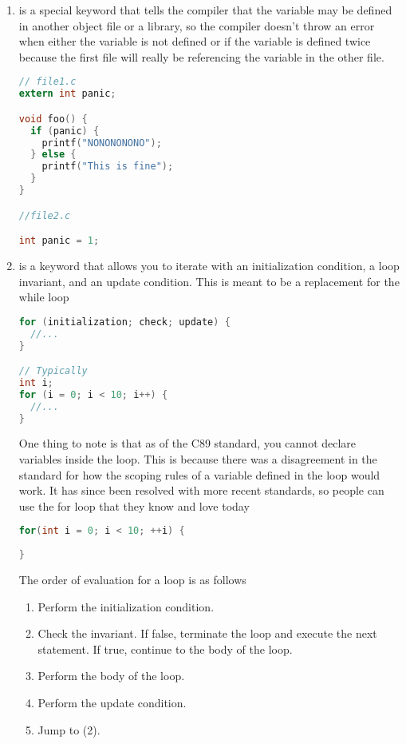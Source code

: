 \begin{enumerate}
\begin{lstlisting}[language=C]
void process_day(enum day foo) {
  switch(foo) {
    case monday:
      printf("Go home!\n"); break;
    // ...
  }
}
\end{lstlisting}

	\item {} is a special keyword that tells the compiler that the variable may be defined in another object file or a library, so the compiler doesn't throw an error when either the variable is not defined or if the variable is defined twice because the first file will really be referencing the variable in the other file.

	      \begin{lstlisting}[language=C]
// file1.c
extern int panic;

void foo() {
  if (panic) {
    printf("NONONONONO");
  } else {
    printf("This is fine");
  }
}

//file2.c

int panic = 1;
\end{lstlisting}

	\item {} is a keyword that allows you to iterate with an initialization condition, a loop invariant, and an update condition. This is meant to be a replacement for the while loop

	      \begin{lstlisting}[language=C]
for (initialization; check; update) {
  //...
}

// Typically
int i;
for (i = 0; i < 10; i++) {
  //...
}
\end{lstlisting}

	      One thing to note is that as of the C89 standard, you cannot declare variables inside the  loop. This is because there was a disagreement in the standard for how the scoping rules of a variable defined in the loop would work. It has since been resolved with more recent standards, so people can use the for loop that they know and love today

	      \begin{lstlisting}[language=C]
for(int i = 0; i < 10; ++i) {
  
}
\end{lstlisting}

	      The order of evaluation for a  loop is as follows

	      \begin{enumerate}
		      \item Perform the initialization condition.
		      \item Check the invariant. If false, terminate the loop and execute the next statement. If true, continue to the body of the loop.
		      \item Perform the body of the loop.
		      \item Perform the update condition.
		      \item Jump to (2).
	      \end{enumerate}


\end{enumerate}
